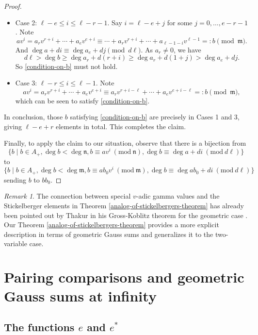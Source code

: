 \documentclass[11pt]{amsart}
\theoremstyle{plain}
\theoremstyle{definition}
\theoremstyle{remark}
\newtheorem{rem}[thm]{Remark}
\numberwithin{equation}{section}
\newcommand{\mfk}{\mathfrak{m}}
\newcommand{\nfk}{\mathfrak{n}}
\newcommand{\Mod}[1]{\ (\mathrm{mod}\ #1)}
\let\l\ell
\begin{document}
\begin{proof}
\begin{itemize}
			\item Case 2: $\l-e \leq i \leq \l-r-1$.
			Say $i = \l-e+j$ for some $j = 0,\ldots,e-r-1$.
			Note
			$$
			av^i = a_rv^{r+i} + \cdots + a_ev^{e+i}
			\equiv \cdots + a_rv^{r+i} + \cdots + a_{\l-1-i}v^{\l-1} 
			=: b \pmod{\mfk}.
			$$
			And $\deg a + di \equiv \deg a_e + dj \pmod{d\l}$.
			As $a_r \neq 0$, we have
			$$
			d\l
			>
			\deg b 
			\geq \deg a_r + d(r + i)
			\geq \deg a_r + d(1 + j)
			> \deg a_e + dj.
			$$
			So \eqref{condition-on-b} must not hold.
			
			\item Case 3: $\l-r \leq i \leq \l-1$.
			Note
			$$
			av^i = a_rv^{r+i} + \cdots + a_ev^{e+i}
			\equiv a_rv^{r+i-\l} + \cdots + a_ev^{e+i-\l} 
			=: b \pmod{\mfk},
			$$
			which can be seen to satisfy \eqref{condition-on-b}.
		\end{itemize}
		In conclusion, those $b$ satisfying \eqref{condition-on-b} are precisely in Cases 1 and 3, giving $\l-e+r$ elements in total.
		This completes the claim.
		
		Finally, to apply the claim to our situation, observe that there is a bijection from
		$$
		\{b \mid b\in A_+, \deg b < \deg \nfk, b \equiv av^i \Mod{\nfk}, \deg b \equiv \deg a + di \Mod{d\l}\}
		$$
		to
		$$
		\{b \mid b\in A_+, \deg b < \deg \mfk, b \equiv ab_0v^i \Mod{\mfk}, \deg b \equiv \deg ab_0 + di \Mod{d\l}\}
		$$
		sending $b$ to $bb_0$.
	\end{proof}
	
	\begin{rem}
		The connection between special $v$-adic gamma values and the Stickelberger elements in Theorem \ref{analog-of-stickelbergers-theorem} has already been pointed out by Thakur in his Gross-Koblitz theorem for the geometric case \cite[Section 8.6]{thakur2004function}.
		Our Theorem \ref{analog-of-stickelbergers-theorem} provides a more explicit description in terms of geometric Gauss sums and generalizes it to the two-variable case.
	\end{rem}
	
	\section{Pairing comparisons and geometric Gauss sums at infinity}   \label{section-pairing-comparisons-and-geometric-gauss-sums-at-infinity}
	
	\subsection{The functions \texorpdfstring{$e$}{e} and \texorpdfstring{$e^*$}{e*}}
	
\end{document}
